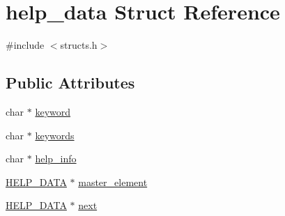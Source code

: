 \hypertarget{structhelp__data}{\section{help\-\_\-data Struct Reference}
\label{structhelp__data}
}


{\ttfamily \#include $<$structs.\-h$>$}

\subsection*{Public Attributes}
\begin{DoxyCompactItemize}
\item 
char $\ast$ \hyperlink{structhelp__data_add6106e94cd862ac363b11d1d9ecf9dd}{keyword}
\item 
char $\ast$ \hyperlink{structhelp__data_a17cfce6421d96e59b19a0e9b8bf32913}{keywords}
\item 
char $\ast$ \hyperlink{structhelp__data_a26cb1630f8e38b9163274fd62941d55d}{help\-\_\-info}
\item 
\hyperlink{structs_8h_a8b4b375191f963e086ad19c556df2438}{H\-E\-L\-P\-\_\-\-D\-A\-T\-A} $\ast$ \hyperlink{structhelp__data_a4b0c86f841a57010ff73222c6967e86f}{master\-\_\-element}
\item 
\hyperlink{structs_8h_a8b4b375191f963e086ad19c556df2438}{H\-E\-L\-P\-\_\-\-D\-A\-T\-A} $\ast$ \hyperlink{structhelp__data_a5e9c4f39cfc8bc5ad3d28f9141c9fc1d}{next}
\end{DoxyCompactItemize}


